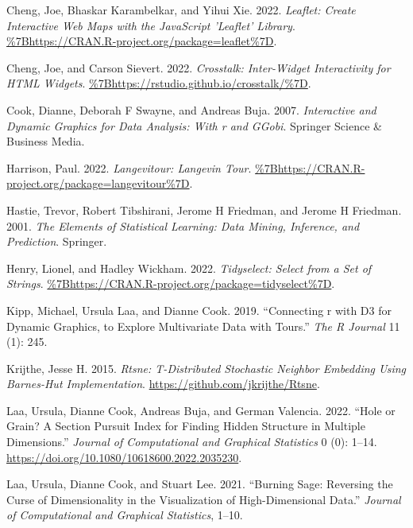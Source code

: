 \begin{CSLReferences}{1}{0}
\leavevmode{}%
Cheng, Joe, Bhaskar Karambelkar, and Yihui Xie. 2022. \emph{Leaflet: Create Interactive Web Maps with the JavaScript 'Leaflet' Library}. \url{\%7Bhttps://CRAN.R-project.org/package=leaflet\%7D}.

\leavevmode{}%
Cheng, Joe, and Carson Sievert. 2022. \emph{Crosstalk: Inter-Widget Interactivity for HTML Widgets}. \url{\%7Bhttps://rstudio.github.io/crosstalk/\%7D}.

\leavevmode{}%
Cook, Dianne, Deborah F Swayne, and Andreas Buja. 2007. \emph{Interactive and Dynamic Graphics for Data Analysis: With r and GGobi}. Springer Science \& Business Media.

\leavevmode{}%
Harrison, Paul. 2022. \emph{Langevitour: Langevin Tour}. \url{\%7Bhttps://CRAN.R-project.org/package=langevitour\%7D}.

\leavevmode{}%
Hastie, Trevor, Robert Tibshirani, Jerome H Friedman, and Jerome H Friedman. 2001. \emph{The Elements of Statistical Learning: Data Mining, Inference, and Prediction}. Springer.

\leavevmode{}%
Henry, Lionel, and Hadley Wickham. 2022. \emph{Tidyselect: Select from a Set of Strings}. \url{\%7Bhttps://CRAN.R-project.org/package=tidyselect\%7D}.

\leavevmode{}%
Kipp, Michael, Ursula Laa, and Dianne Cook. 2019. {``Connecting r with D3 for Dynamic Graphics, to Explore Multivariate Data with Tours.''} \emph{The R Journal} 11 (1): 245.

\leavevmode{}%
Krijthe, Jesse H. 2015. \emph{{Rtsne}: T-Distributed Stochastic Neighbor Embedding Using Barnes-Hut Implementation}. \url{https://github.com/jkrijthe/Rtsne}.

\leavevmode{}%
Laa, Ursula, Dianne Cook, Andreas Buja, and German Valencia. 2022. {``Hole or Grain? A Section Pursuit Index for Finding Hidden Structure in Multiple Dimensions.''} \emph{Journal of Computational and Graphical Statistics} 0 (0): 1--14. \url{https://doi.org/10.1080/10618600.2022.2035230}.

\leavevmode{}%
Laa, Ursula, Dianne Cook, and Stuart Lee. 2021. {``Burning Sage: Reversing the Curse of Dimensionality in the Visualization of High-Dimensional Data.''} \emph{Journal of Computational and Graphical Statistics}, 1--10.


\end{CSLReferences}
